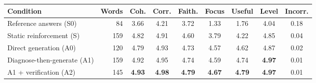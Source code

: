 \begin{tabular}{lrccccccc}
\toprule
Condition & Words & Coh. & Corr. & Faith. & Focus & Useful & Level & Incorr. \\
\midrule
Reference answers (S0) & 84 & 3.66 & 4.21 & 3.72 & 1.33 & 1.76 & 4.04 & 0.18 \\
\midrule
Static reinforcement (S) & 159 & 4.82 & 4.91 & 4.60 & 3.79 & 4.22 & 4.85 & 0.04 \\
Direct generation (A0) & 120 & 4.79 & 4.93 & 4.73 & 4.57 & 4.62 & 4.87 & 0.02 \\
Diagnose-then-generate (A1) & 159 & 4.92 & 4.95 & 4.74 & 4.59 & 4.74 & \textbf{4.97} & 0.01 \\
A1 + verification (A2) & 145 & \textbf{4.93} & \textbf{4.98} & \textbf{4.79} & \textbf{4.67} & \textbf{4.79} & \textbf{4.97} & 0.01 \\
\bottomrule
\end{tabular}